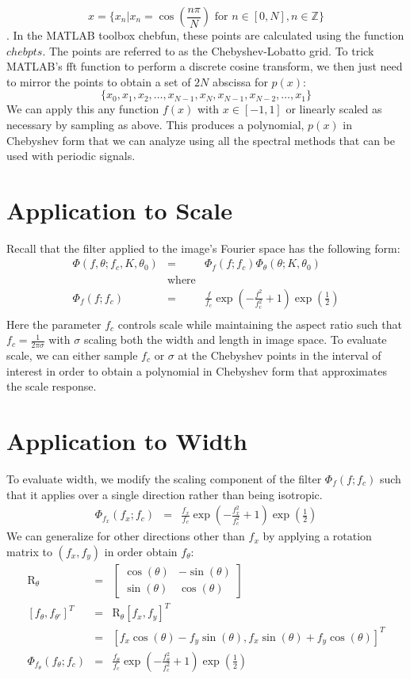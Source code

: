 \documentclass{article}
\begin{document}
\[ x = \{ x_n | x_n = \cos(\frac{n\pi}{N}) \mbox{ for } n \in [0,N], n \in \mathbb{Z} \} \].
In the MATLAB toolbox chebfun, these points are calculated using the function $ chebpts $. The points are referred to as the Chebyshev-Lobatto grid. To trick MATLAB's fft function to perform a discrete cosine transform, we then just need to mirror the points to obtain a set of $ 2N $ abscissa for $ p(x) $:
\[ \{x_0, x_1, x_2, \hdots, x_{N-1}, x_N, x_{N-1}, x_{N-2}, \hdots, x_1\} \]
We can apply this any function $ f(x) $ with $ x \in [-1,1] $ or linearly scaled as necessary by sampling as above. This produces a polynomial, $ p(x) $ in Chebyshev form that we can analyze using all the spectral methods that can be used with periodic signals.
\section{Application to Scale}
Recall that the filter applied to the image's Fourier space has the following form:
\begin{eqnarray}
    \Phi(f,\theta; f_c, K, \theta_0) & = & \Phi_f(f; f_c) \Phi_\theta(\theta; K, \theta_0) \\
    & \mbox{where} & \nonumber \\
    \Phi_f(f; f_c) & = & \frac{f}{f_c} \exp(-\frac{f^2}{f_c^2}+1) \exp(\frac{1}{2}) \\
\end{eqnarray}
Here the parameter $ f_c $ controls scale while maintaining the aspect ratio such that $ f_c = \frac{1}{2\pi \sigma} $ with $ \sigma $ scaling both the width and length in image space. To evaluate scale, we can either sample $ f_c $ or $ \sigma $ at the Chebyshev points in the interval of interest in order to obtain a polynomial in Chebyshev form that approximates the scale response.
\section{Application to Width}
To evaluate width, we modify the scaling component of the filter $ \Phi_f(f; f_c) $ such that it applies over a single direction rather than being isotropic.
\begin{eqnarray}
    \Phi_{f_x}(f_x; f_c) & = & \frac{f_x}{f_c} \exp(-\frac{f_x^2}{f_c^2}+1) \exp(\frac{1}{2})
\end{eqnarray}
We can generalize for other directions other than $ f_x $ by applying a rotation matrix to $ (f_x,f_y) $ in order obtain $ f_\theta $:
\begin{eqnarray}
    \mathrm{R}_\theta & = &
    \begin{bmatrix}
        \cos(\theta) & -\sin(\theta) \\
        \sin(\theta) & \cos(\theta)
    \end{bmatrix} \\
   \left[f_{\theta},f_{\theta'}\right]^T  & = & \mathrm{R}_\theta [f_x,f_y]^T \\
    & = & [ f_x\cos(\theta)  -f_y \sin(\theta) , f_x \sin(\theta) + f_y \cos(\theta) ]^T  \\
    \Phi_{f_\theta}(f_\theta; f_c) & = & \frac{f_\theta}{f_c} \exp(-\frac{f_\theta^2}{f_c^2}+1) \exp(\frac{1}{2})
\end{eqnarray}
\end{document}
